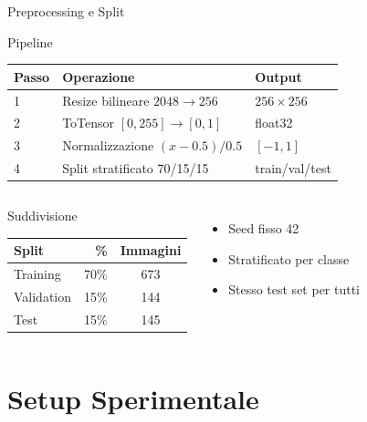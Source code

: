\documentclass[italian,10pt]{beamer}
\begin{document}
\begin{frame}{Preprocessing e Split}
  \begin{block}{Pipeline}
    \begin{tabular}{lll}\toprule
      \textbf{Passo} & \textbf{Operazione} & \textbf{Output}\\\midrule
      1 & Resize bilineare $2048\to256$ & $256\times256$\\
      2 & ToTensor $[0,255]\to[0,1]$ & float32\\
      3 & Normalizzazione $(x-0.5)/0.5$ & $[-1,1]$\\
      4 & Split stratificato 70/15/15 & train/val/test\\\bottomrule
    \end{tabular}
  \end{block}
  \begin{columns}
      \begin{block}{Suddivisione}
        \begin{tabular}{lrc}\toprule
          \textbf{Split} & \textbf{\%} & \textbf{Immagini}\\\midrule
          Training  & 70\% & 673\\
          Validation & 15\% & 144\\
          Test      & 15\% & 145\\\bottomrule
        \end{tabular}
      \end{block}
      \begin{itemize}
        \item Seed fisso 42
        \item Stratificato per classe
        \item Stesso test set per tutti
      \end{itemize}
  \end{columns}
\end{frame}

\section{Setup Sperimentale}
\end{document}
